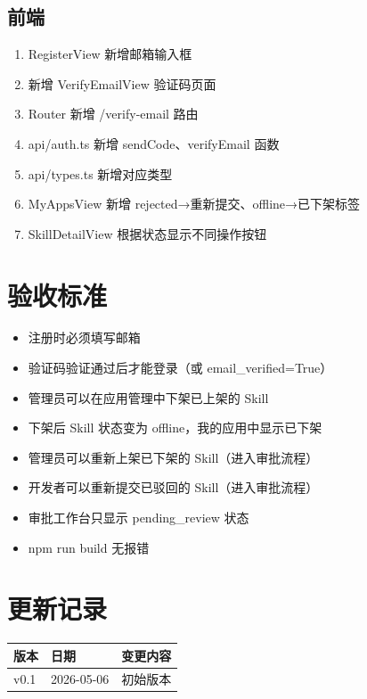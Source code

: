 \documentclass[11pt,a4paper]{article}
\begin{document}
\subsection{前端}

\begin{enumerate}[nosep]
  \item RegisterView 新增邮箱输入框
  \item 新增 VerifyEmailView 验证码页面
  \item Router 新增 /verify-email 路由
  \item api/auth.ts 新增 sendCode、verifyEmail 函数
  \item api/types.ts 新增对应类型
  \item MyAppsView 新增 rejected→重新提交、offline→已下架标签
  \item SkillDetailView 根据状态显示不同操作按钮
\end{enumerate}

\section{验收标准}

\begin{itemize}
  \item[$\square$] 注册时必须填写邮箱
  \item[$\square$] 验证码验证通过后才能登录（或 email\_verified=True）
  \item[$\square$] 管理员可以在应用管理中下架已上架的 Skill
  \item[$\square$] 下架后 Skill 状态变为 offline，我的应用中显示已下架
  \item[$\square$] 管理员可以重新上架已下架的 Skill（进入审批流程）
  \item[$\square$] 开发者可以重新提交已驳回的 Skill（进入审批流程）
  \item[$\square$] 审批工作台只显示 pending\_review 状态
  \item[$\square$] npm run build 无报错
\end{itemize}

\section*{更新记录}

\begin{tabular}{lll}
\toprule
版本 & 日期 & 变更内容 \\
\midrule
v0.1 & 2026-05-06 & 初始版本 \\
\bottomrule
\end{tabular}
\end{document}
